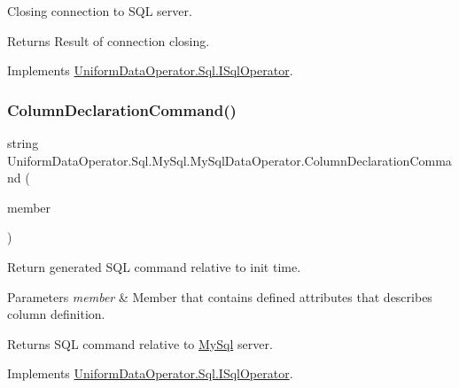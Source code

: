 Closing connection to S\+QL server. 

\begin{DoxyReturn}{Returns}
Result of connection closing.
\end{DoxyReturn}


Implements \mbox{\hyperlink{interface_uniform_data_operator_1_1_sql_1_1_i_sql_operator_a1a6429996e1bbb452f4e034fd634e640}{Uniform\+Data\+Operator.\+Sql.\+I\+Sql\+Operator}}.

\mbox{\label{class_uniform_data_operator_1_1_sql_1_1_my_sql_1_1_my_sql_data_operator_a0bdc2943e5d10576fb564913cdd744e7}} 
\subsubsection{\texorpdfstring{Column\+Declaration\+Command()}{ColumnDeclarationCommand()}}
{\footnotesize\ttfamily string Uniform\+Data\+Operator.\+Sql.\+My\+Sql.\+My\+Sql\+Data\+Operator.\+Column\+Declaration\+Command (\begin{DoxyParamCaption}\item[{Member\+Info}]{member }\end{DoxyParamCaption})}



Return generated S\+QL command relative to init time. 


\begin{DoxyParams}{Parameters}
{\em member} & Member that contains defined attributes that describes column definition.\\
\hline
\end{DoxyParams}
\begin{DoxyReturn}{Returns}
S\+QL command relative to \mbox{\hyperlink{namespace_uniform_data_operator_1_1_sql_1_1_my_sql}{My\+Sql}} server.
\end{DoxyReturn}


Implements \mbox{\hyperlink{interface_uniform_data_operator_1_1_sql_1_1_i_sql_operator_aac9c3ed1e73af66e383340a154786ec7}{Uniform\+Data\+Operator.\+Sql.\+I\+Sql\+Operator}}.

